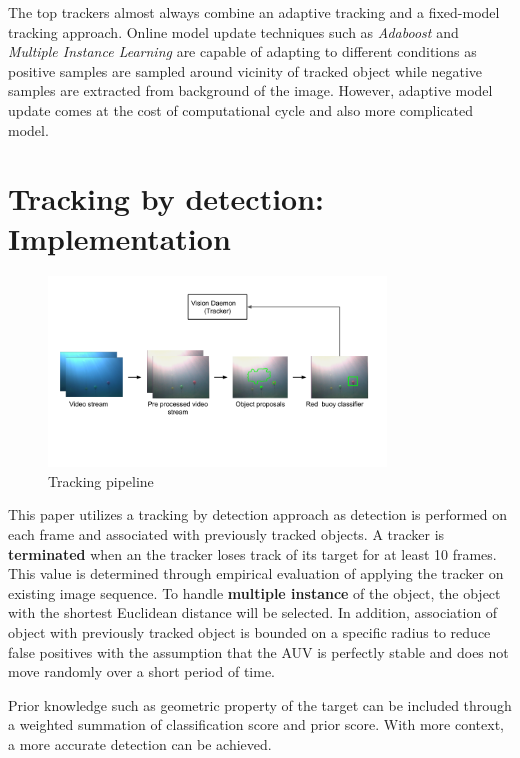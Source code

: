 \documentclass[fypca]{socreport}
\begin{document}
The top trackers almost always combine an adaptive tracking and a fixed-model
tracking approach. Online model update techniques such as \textit{Adaboost} and
\textit{Multiple Instance Learning} are capable of adapting to different
conditions as positive samples are sampled around vicinity of tracked object
while negative samples are extracted from background of the image. However,
adaptive model update comes at the cost of computational cycle and also more
complicated model. 

\section{Tracking by detection: Implementation}

\begin{figure}[H]
\centering
  \includegraphics[width=0.8\textwidth, height=0.3\textheight]{tracker.png}
  \caption{Tracking pipeline}
  \label{fig:tracker}
\end{figure}

This paper utilizes a tracking by detection approach as detection is performed
on each frame and associated with previously tracked objects. A tracker is
\textbf{terminated} when an the tracker loses track of its target for at least
10 frames. This value is determined through empirical evaluation of applying the
tracker on existing image sequence. To handle \textbf{multiple instance} of the
object, the object with the shortest Euclidean distance will be selected. In
addition, association of object with previously tracked object is bounded on a
specific radius to reduce false positives with the assumption that the AUV is
perfectly stable and does not move randomly over a short period of time.

Prior knowledge such as geometric property of the target can be included through
a weighted summation of classification score and prior score. With more context,
a more accurate detection can be achieved.
\end{document}
